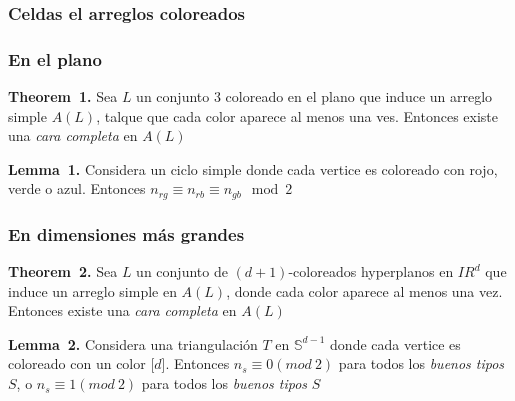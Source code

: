 \documentclass[xcolor=table]{beamer}
\begin{document}
\begin{mdframe}%

\frametitle{Celdas el arreglos coloreados}\label{heading-sec-celdas-el-arreglos-coloreados}%
\end{mdframe}\label{sec-celdas-el-arreglos-coloreados}%

\begin{mdframe}%

\frametitle{En el plano}\label{heading-sec-en-el-plano}%

\begin{mdbmarginx}{1ex}{0pt}{1ex}{0pt}%
\noindent{}\textbf{Theorem~1.} \mdbr
{}  Sea $L$ un conjunto 3 coloreado en el plano que induce un arreglo simple $A(L)$, talque
que cada color aparece al menos una ves. Entonces existe una \emph{cara completa} en $A(L)$%
\end{mdbmarginx}%

\begin{mdbmarginx}{1ex}{0pt}{1ex}{0pt}%
\noindent{}\textbf{Lemma~1.} \mdbr
{} Considera un ciclo simple donde cada vertice es coloreado con rojo, verde o azul. Entonces
 $n_{rg} \equiv n_{rb} \equiv n_{gb} \mod 2$%
\end{mdbmarginx}%
\end{mdframe}\label{sec-en-el-plano}%

\begin{mdframe}%

\frametitle{En dimensiones más grandes}\label{heading-sec-en-dimensiones-ms-grandes}%

\begin{mdbmarginx}{1ex}{0pt}{1ex}{0pt}%
\noindent{}\textbf{Theorem~2.} \mdbr
{}Sea $L$ un conjunto de $(d+1)$-coloreados hyperplanos en $I\!R^{d}$ que induce un arreglo simple
en $A(L)$, donde cada color aparece al menos una vez. Entonces existe una \emph{cara completa} en $A(L)$%
\end{mdbmarginx}%

\begin{mdbmarginx}{1ex}{0pt}{1ex}{0pt}%
\noindent{}\textbf{Lemma~2.} \mdbr
{}Considera una triangulación $T$ en $\mathbb{S}^{d-1}$ donde cada vertice es coloreado con un color
[$d$]. Entonces $n_{s} \equiv 0(mod\ 2)$ para todos los \emph{buenos tipos} $S$, o
$n_{s} \equiv 1 (mod\ 2)$ para todos los \emph{buenos tipos} $S$%
\end{mdbmarginx}%
\end{mdframe}\label{sec-en-dimensiones-ms-grandes}%
\end{document}
